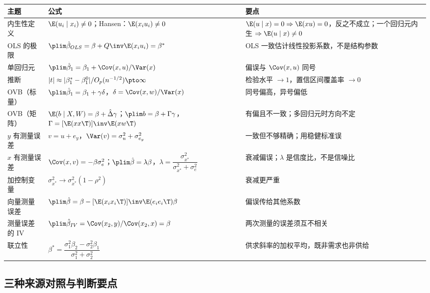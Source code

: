 \begin{center}
\small
\begin{tabularx}{\linewidth}{>{\raggedright\arraybackslash}p{2.3cm}>{\raggedright\arraybackslash}p{6.2cm}L}
\toprule
主题 & 公式 & 要点\\
\midrule
内生性定义 & $\E(u_i\mid x_i)\neq0$；Hansen：$\E(x_iu_i)\neq0$ & $\E(u\mid x)=0\Rightarrow\E(xu)=0$，反之不成立；一个回归元内生 $\Rightarrow\E(u\mid x)\neq0$\\
OLS 的极限 & $\plim\hat\beta_{OLS}=\beta+Q\inv\E(x_iu_i)=\beta^*$ & OLS 一致估计线性投影系数，不是结构参数\\
单回归元 & $\plim\hat\beta_1=\beta_1+\Cov(x,u)/\Var(x)$ & 偏误与 $\Cov(x,u)$ 同号\\
推断 & $|t|\approx|\beta_1^*-\beta_1^0|/O_p(n^{-1/2})\pto\infty$ & 检验水平 $\to1$，置信区间覆盖率 $\to0$\\
OVB（标量） & $\plim\hat\beta_1=\beta_1+\gamma\delta$，$\delta=\Cov(x,w)/\Var(x)$ & 同号偏高，异号偏低\\
OVB（矩阵） & $\E(b\mid X,W)=\beta+\hat\Delta\gamma$；$\plim b=\beta+\Gamma\gamma$，$\Gamma=[\E(xx\T)]\inv\E(xw\T)$ & 有偏且不一致；多回归元时方向不定\\
$y$ 有测量误差 & $v=u+e_y$，$\Var(v)=\sigma_u^2+\sigma_{e_y}^2$ & 一致但不够精确；用稳健标准误\\
$x$ 有测量误差 & $\Cov(x,v)=-\beta\sigma_e^2$；$\plim\hat\beta=\lambda\beta$，$\lambda=\dfrac{\sigma_{x^*}^2}{\sigma_{x^*}^2+\sigma_e^2}$ & 衰减偏误；$\lambda$ 是信度比，不是信噪比\\
加控制变量 & $\sigma_{x^*}^2\to\sigma_{x^*}^2(1-\rho^2)$ & 衰减更严重\\
向量测量误差 & $\plim\hat\beta=\beta-[\E(x_ix_i\T)]\inv\E(e_ie_i\T)\beta$ & 偏误传给其他系数\\
测量误差的 IV & $\plim\hat\beta_{IV}=\Cov(x_2,y)/\Cov(x_2,x)=\beta$ & 两次测量的误差须互不相关\\
联立性 & $\beta^*=\dfrac{\sigma_1^2\beta_2-\sigma_2^2\beta_1}{\sigma_1^2+\sigma_2^2}$ & 供求斜率的加权平均，既非需求也非供给\\
\bottomrule
\end{tabularx}
\end{center}

\subsection{三种来源对照与判断要点}

